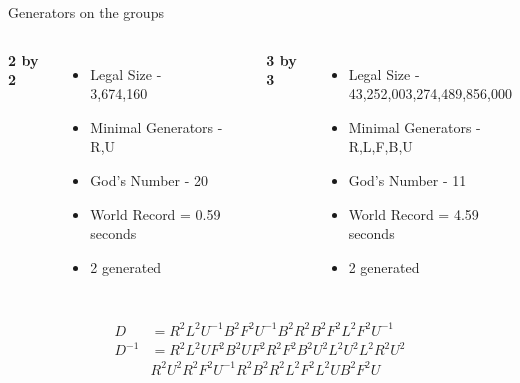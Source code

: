 \documentclass{beamer}
\begin{document}
\begin{frame}[t]{Generators on the groups}

\begin{columns}
\textbf{2 by 2}
\begin{itemize}
\item Legal Size -\\  3,674,160
\item Minimal Generators -\\ R,U
\item God's Number - 20
\item World Record = 0.59 seconds
\item 2 generated
\end{itemize}

\textbf{3 by 3}
\begin{itemize}
\item Legal Size -\\  43,252,003,274,489,856,000
\item Minimal Generators -\\ R,L,F,B,U
\item God's Number - 11
\item World Record = 4.59 seconds
\item 2 generated
\end{itemize}
\end{columns}

\begin{align*}
D &= R^{2}L^{2}U^{-1}B^{2}F^{2}U^{-1}B^{2}R^{2}B^{2}F^{2}L^{2}F^{2}U^{-1} \\
D^{-1} &= R^{2}L^{2}UF^{2}B^{2}UF^{2}R^{2}F^{2}B^{2}U^{2}L^{2}U^{2}L^{2}R^{2}U^{2}\\ &R^{2}U^{2}R^{2}F^{2}U^{-1}R^{2}B^{2}R^{2}L^{2}F^{2}L^{2}UB^{2}F^{2}U
\end{align*}
 
\end{frame}
\end{document}
